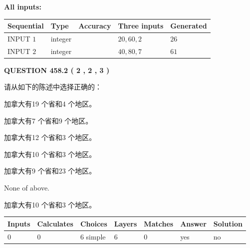 \documentclass{ctexart}
\begin{document}
   
   
   
\noindent\vspace{0.1in}\hspace{-0.08in} {\textbf{\Large{All inputs: }}}
   
   
  
  
\noindent\begin{tabular}{|l|l|l|l|l|}
\hline
 Sequential & Type & Accuracy & Three inputs & Generated \\ 
\hline
 
 
  INPUT $  1 $ & integer &  & $
 20
 , 
 60
 , 
 2
 $ & $ 26 $ 
 \\  \hline  
 
 
  INPUT $  2 $ & integer &  & $
 40
 , 
 80
 , 
 7
 $ & $ 61 $ 
 \\  \hline  
 \end{tabular}
   
   
  
\vspace{0.2in}
  
{\textbf{\Large{QUESTION
458.2 
 ( 2 , 2 , 3 )
}}}
  
  
请从如下的陈述中选择正确的：
 
 
加拿大有19 个省和4 个地区。
 
 
加拿大有7 个省和9 个地区。
 
 
加拿大有12 个省和3 个地区。
 
 
加拿大有10 个省和3 个地区。
 
 
加拿大有9 个省和23 个地区。
 
 
 None of above.
 
 
\noindent{}
 
 
加拿大有10 个省和3 个地区。
 
 
\noindent{}
 
 
   
   
   
   
\noindent\begin{tabular}{|l|l|l|l|l|l|l|}
 \hline
Inputs & Calculates & Choices & Layers & Matches & Answer & Solution \\ \hline
 0  & 
 0  & 
 6
  simple  
  & 
 6  & 
 0  & 
  yes & 
  no 
  \\ \hline
 \end{tabular}
   
\end{document}
